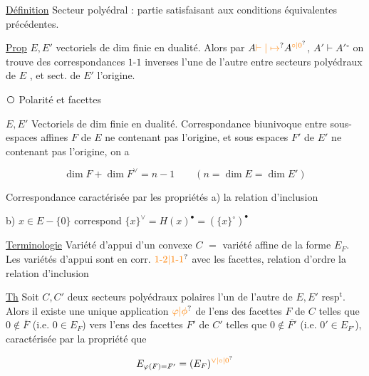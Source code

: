 
\uline{Définition} Secteur polyédral : partie satisfaisant aux conditions équivalentes précédentes.

\uline{Prop} $E,E'$ vectoriels de dim finie en dualité. Alors par $A\unsure{\vdash|\mapsto}A^{\unsure{\circ|0}}$, $A'\vdash A'{}^\circ$ on trouve des correspondances $1$-$1$ inverses l'une de l'autre entre secteurs polyédraux de $E$   , et sect.  de $E'$  l'origine.

\textcircled{} Polarité et facettes

$E,E'$ Vectoriels de dim finie en dualité. Correspondance biunivoque entre sous-espaces affines $F$ de $E$ ne contenant pas l'origine, et sous espaces  $F'$ de $E'$ ne contenant pas l'origine, on a


\[
 \dim F+\dim F^\vee=n-1\qquad(n=\dim E=\dim E')
\]

Correspondance caractérisée par les propriétés a)  la relation d'inclusion

b)  $x\in E-\{0\}$ correspond $\{x\}^\vee=H(x)^{\bullet}=(\{x\}^{\circ})^\bullet$


\uline{Terminologie} Variété d'appui d'un convexe $C$ $=$ variété affine de la forme $E_F$. Les variétés d'appui sont en corr. $\unsure{1\text{-}2|1\text{-}1}$ avec les facettes, relation d'ordre la relation d'inclusion

 \uline{Th} Soit $C,C'$ deux secteurs polyédraux polaires l'un de l'autre de $E,E'$ resp$^{\mathrm t}$. Alors il existe une unique  application $\unsure{\varphi|\phi}$ de l'ens des facettes $F$ de $C$ telles que $0\notin\overline F$ (i.e. $0\in E_F$) vers l'ens des facettes $F'$ de $C'$ telles que $0\notin\overline{F'}$ (i.e. $0'\in E_{F'}$), caractérisée par la propriété que  

\[
 E_{\varphi(F)=F'}=(E_F)^{\unsure{\vee|\circ|0}}
\]

